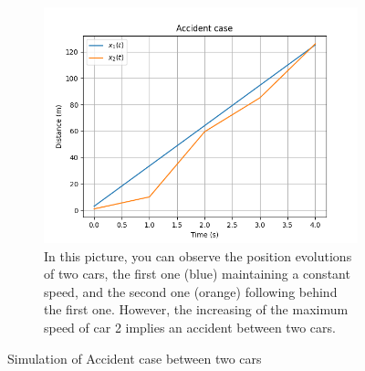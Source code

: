 \documentclass{article}
\begin{document}
\begin{figure}[H]
		\vspace{1cm}
		
		\begin{subfigure}[b]{0.7\textwidth}
			\centering
			\includegraphics[width=\textwidth]{1W2_Acc3.png}
			\caption{In this picture, you can observe the position evolutions of two cars, the first one (blue) maintaining a constant speed, and the second one (orange) following behind the first one. However, the increasing of the maximum speed of car 2 implies an accident between two cars.}
			\label{fig:sub3}
		\end{subfigure}
		\caption{Simulation of Accident case between two cars}
		\label{fig:accident_simulation}
	\end{figure}
	
	\newpage
	
	\printbibliography
\end{document}
